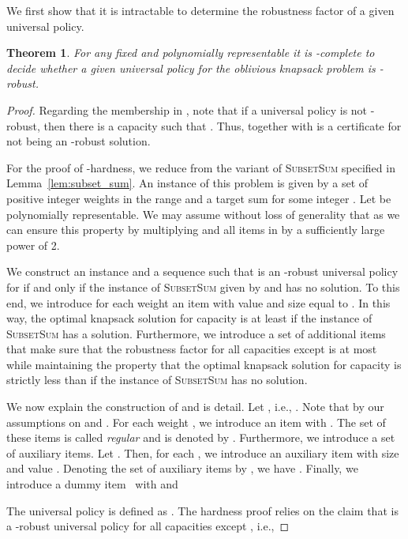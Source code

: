 \documentclass[11pt]{article}
\newtheorem{theorem}{Theorem}
\begin{document}
We first show that it is intractable to determine the robustness factor
of a given universal policy.
\begin{theorem}
\label{thm:hardness} For any fixed and polynomially representable
 it is -complete to decide whether a given
universal policy for the oblivious knapsack problem is -robust.\end{theorem}
\begin{proof}
Regarding the membership in , note that if a universal
policy  is not -robust, then there is a capacity 
such that . Thus,  together with
 is a certificate for  not being an -robust
solution. 

For the proof of -hardness, we reduce from the variant
of \textsc{SubsetSum} specified in Lemma~\ref{lem:subset_sum}. An
instance of this problem is given by a set 
of positive integer weights in the range  and a target sum
 for some integer . Let  be polynomially
representable. We may assume without loss of generality that 
as we can ensure this property by multiplying  and all items in
 by a sufficiently large power of 2.

We construct an instance  and a sequence  such that 
is an -robust universal policy for  if and
only if the instance of \textsc{SubsetSum} given by  and 
has no solution. To this end, we introduce for each weight 
an item with value and size equal to . In this way, the optimal
knapsack solution for capacity  is at least  if the instance
of \textsc{SubsetSum} has a solution. Furthermore, we introduce a
set of additional items that make sure that the robustness factor
for all capacities except  is at most  while maintaining
the property that the optimal knapsack solution for capacity 
is strictly less than  if the instance of \textsc{SubsetSum} has
no solution.

We now explain the construction of  and  is detail. Let
, i.e., .
Note that  by our assumptions on  and .
For each weight , we introduce an item  with .
The set of these items is called \emph{regular} and is denoted by
. Furthermore, we introduce a set of auxiliary
items. Let . Then, for each ,
we introduce an auxiliary item  with size 
and value . Denoting the set of auxiliary
items by , we have .
Finally, we introduce a dummy item~ with  and 

The universal policy  is defined as .
The hardness proof relies on the claim that  is a -robust
universal policy for all capacities except , i.e., 




\end{proof}
\end{document}
